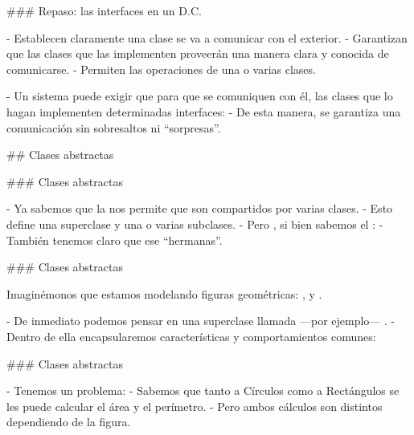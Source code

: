 ### Repaso: las interfaces en un D.C.


- Establecen claramente  una clase se va a comunicar con el exterior.
    - Garantizan que las clases que las implementen proveerán una manera clara y conocida de comunicarse.
- Permiten  las operaciones de una o varias clases.

- Un sistema puede exigir que para que se comuniquen con él, las clases que lo hagan implementen determinadas interfaces:
    - De esta manera, se garantiza una comunicación sin sobresaltos ni ``sorpresas''.

## Clases abstractas

### Clases abstractas


- Ya sabemos que la  nos permite  que son
compartidos por varias clases.
    - Esto define una superclase y una o varias subclases.
- Pero , si bien sabemos el :
    - También tenemos claro que ese  ``hermanas''.

### Clases abstractas


Imaginémonos que estamos modelando figuras geométricas: ,  y .

- De inmediato podemos pensar en una superclase llamada ---por ejemplo--- .
    - Dentro de ella encapsularemos características y comportamientos comunes:


### Clases abstractas


\vspace{-1.5em}
\columnsbegin
{}

- Tenemos un problema:
    - Sabemos que tanto a Círculos como a Rectángulos se les puede calcular el área y el perímetro.
    - Pero ambos cálculos son distintos dependiendo de la figura.

